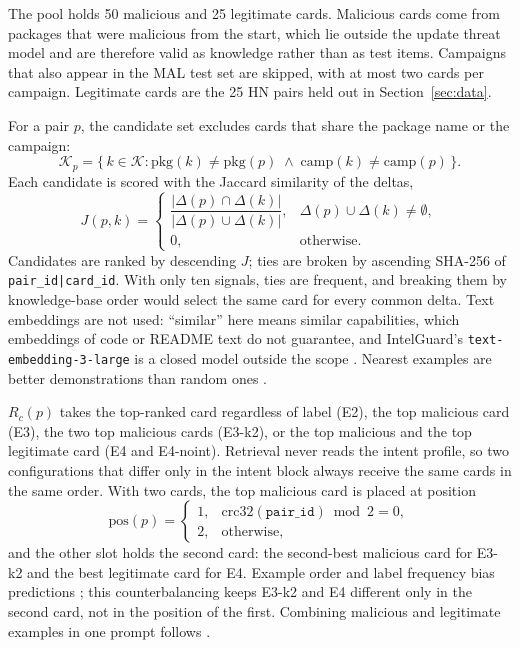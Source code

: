 \documentclass[a4paper,fleqn]{cas-dc}
\begin{document}
The pool holds 50 malicious and 25 legitimate cards. Malicious cards come from
packages that were malicious from the start, which lie outside the update
threat model \citep{sofaer2024rogueone} and are therefore valid as knowledge
rather than as test items. Campaigns that also appear in the MAL test set are
skipped, with at most two cards per campaign. Legitimate cards are the 25 HN
pairs held out in Section~\ref{sec:data}.

For a pair $p$, the candidate set excludes cards that share the package name
or the campaign:
\begin{equation}
\mathcal{K}_p = \{\,k \in \mathcal{K} : \mathrm{pkg}(k) \neq \mathrm{pkg}(p)
\;\wedge\; \mathrm{camp}(k) \neq \mathrm{camp}(p)\,\}.
\label{eq:candidates}
\end{equation}
Each candidate is scored with the Jaccard similarity of the deltas,
\begin{equation}
J(p, k) =
\begin{cases}
\dfrac{|\Delta(p) \cap \Delta(k)|}{|\Delta(p) \cup \Delta(k)|}, & \Delta(p) \cup \Delta(k) \neq \emptyset,\\[1ex]
0, & \text{otherwise}.
\end{cases}
\label{eq:jaccard}
\end{equation}
Candidates are ranked by descending $J$; ties are broken by ascending SHA-256
of \texttt{pair\_id|card\_id}. With only ten signals, ties are frequent, and
breaking them by knowledge-base order would select the same card for every
common delta. Text embeddings are not used: ``similar'' here means similar
capabilities, which embeddings of code or README text do not guarantee, and
IntelGuard's \texttt{text-embedding-3-large} is a closed model outside the
scope \citep{guo2026bridging}. Nearest examples are better demonstrations than
random ones \citep{liu2022makes}.

$R_c(p)$ takes the top-ranked card regardless of label (E2), the top malicious
card (E3), the two top malicious cards (E3-k2), or the top malicious and the
top legitimate card (E4 and E4-noint). Retrieval never reads the intent
profile, so two configurations that differ only in the intent block always
receive the same cards in the same order. With two cards, the top malicious
card is placed at position
\begin{equation}
\mathrm{pos}(p) =
\begin{cases}
1, & \mathrm{crc32}(\texttt{pair\_id}) \bmod 2 = 0,\\
2, & \text{otherwise},
\end{cases}
\label{eq:position}
\end{equation}
and the other slot holds the second card: the second-best malicious card for
E3-k2 and the best legitimate card for E4. Example order and label frequency
bias predictions \citep{zhao2021calibrate}; this counterbalancing keeps E3-k2
and E4 different only in the second card, not in the position of the first.
Combining malicious and legitimate examples in one prompt follows
\citet{gao2024customizing}.
\end{document}
